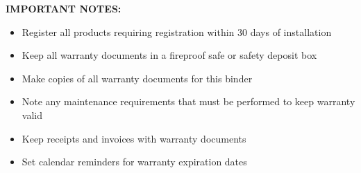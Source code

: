 \documentclass[11pt,letterpaper]{article}
\begin{document}
\vspace{6pt}

\textbf{IMPORTANT NOTES:}

\begin{itemize}[leftmargin=0.5in]
\item Register all products requiring registration within 30 days of installation
\item Keep all warranty documents in a fireproof safe or safety deposit box
\item Make copies of all warranty documents for this binder
\item Note any maintenance requirements that must be performed to keep warranty valid
\item Keep receipts and invoices with warranty documents
\item Set calendar reminders for warranty expiration dates
\end{itemize}
\end{document}
